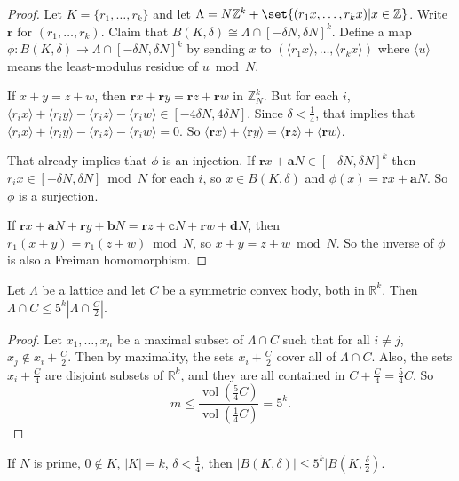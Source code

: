 \documentclass{article}
\newcommand{\1}[1]{\mathbbm{1}_{#1}}
\begin{document}
\begin{proof}
  Let $K = \{r_1, \dotsc, r_k\}$ and let $\Lambda = N \mathbb{Z}^k + \set{(r_1 x, \dotsc, r_k x) | x \in \mathbb{Z}}$.
  Write $\mathbf{r}$ for $(r_1, \dotsc, r_k)$.
  Claim that $B(K, \delta) \cong \Lambda \cap [-\delta N, \delta N]^k$.
  Define a map $\phi: B(K, \delta) \to \Lambda \cap [-\delta N, \delta N]^k$ by sending $x$ to $(\langle r_1 x \rangle, \dotsc, \langle r_k x \rangle)$ where $\langle u \rangle$ means the least-modulus residue of $u \bmod N$.

  If $x + y = z + w$, then $\mathbf{r} x + \mathbf{r} y = \mathbf{r} z + \mathbf{r} w$ in $\mathbb{Z}_N^k$.
  But for each $i$, $\langle r_i x \rangle + \langle r_i y \rangle - \langle r_i z \rangle - \langle r_i w \rangle \in [-4 \delta N, 4 \delta N]$.
  Since $\delta < \frac{1}{4}$, that implies that $\langle r_i x \rangle + \langle r_i y\rangle - \langle r_i z \rangle - \langle r_i w \rangle = 0$.
  So $\langle \mathbf{r} x \rangle + \langle \mathbf{r} y \rangle = \langle \mathbf{r} z \rangle + \langle \mathbf{r} w \rangle$.

  That already implies that $\phi$ is an injection.
  If $\mathbf{r} x + \mathbf{a} N \in [-\delta N, \delta N]^k$ then $r_i x \in [-\delta N, \delta N] \bmod{N}$ for each $i$, so $x \in B(K, \delta)$ and $\phi(x) = \mathbf{r} x + \mathbf{a} N$.
  So $\phi$ is a surjection.

  If $\mathbf{r} x + \mathbf{a} N + \mathbf{r} y + \mathbf{b} N = \mathbf{r} z + \mathbf{c} N + \mathbf{r} w + \mathbf{d} N$, then $r_1 (x+y) = r_1 (z + w) \bmod{N}$, so $x + y = z + w \bmod{N}$.
  So the inverse of $\phi$ is also a Freiman homomorphism.
\end{proof}
\begin{nlemma}\label{lem:1.10}
  Let $\Lambda$ be a lattice and let $C$ be a symmetric convex body, both in $\mathbb{R}^k$.
  Then $\Lambda \cap C \leq 5^k |\Lambda \cap \frac{C}{2}|$.
\end{nlemma}
\begin{proof}
  Let $x_1, \dotsc, x_n$ be a maximal subset of $\Lambda \cap C$ such that for all $i \neq j$, $x_j \notin x_i + \frac{C}{2}$.
  Then by maximality, the sets $x_i + \frac{C}{2}$ cover all of $\Lambda \cap C$.
  Also, the sets $x_i + \frac{C}{4}$ are disjoint subsets of $\mathbb{R}^k$, and they are all contained in $C + \frac{C}{4} = \frac{5}{4} C$.
  So
  \begin{equation*}
    m \leq \frac{\operatorname{vol}(\frac{5}{4} C)}{\operatorname{vol}(\frac{1}{4} C)} = 5^k.
  \end{equation*}
\end{proof}
\begin{ncor}
  If $N$ is prime, $0 \notin K$, $|K| = k$, $\delta < \frac{1}{4}$, then $|B(K,\delta)| \leq 5^k |B(K, \frac{\delta}{2})$.
\end{ncor}
\end{document}
